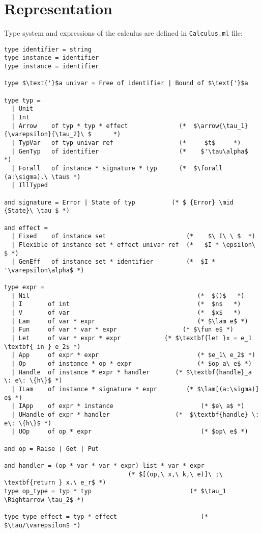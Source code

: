 \documentclass[declaration,shortabstract]{iithesis}
\theoremstyle{definition} \newtheorem{definition}{Definition}[section]
\newcommand{\arrow}[3]{{#1}\rightarrow_{#2}{#3}}
\newcommand{\lam}[1][x]{\ensuremath{\lambda #1.\:}}
\newcommand{\fun}[1][f,\:x]{\ensuremath{\textbf{fun } #1.\:}}
\begin{document}
\section{Representation}
Type system and expressions of the calculus are defined in \texttt{Calculus.ml} file:
\begin{lstlisting}
type identifier = string
type instance = identifier
type instance = identifier

type $\text{'}$a univar = Free of identifier | Bound of $\text{'}$a

type typ =
  | Unit
  | Int
  | Arrow    of typ * typ * effect              (*  $\arrow{\tau_1}{\varepsilon}{\tau_2}\ $      *)
  | TypVar   of typ univar ref                  (*     $t$     *)
  | GenTyp   of identifier                      (*    $'\tau\alpha$      *)
  | Forall   of instance * signature * typ      (*  $\forall (a:\sigma).\ \tau$ *)
  | IllTyped

and signature = Error | State of typ          (* $ {Error} \mid {State}\ \tau $ *)

and effect =
  | Fixed    of instance set                      (*    $\ I\ \ $  *)
  | Flexible of instance set * effect univar ref  (*   $I * \epsilon\ $ *)
  | GenEff   of instance set * identifier         (*  $I * '\varepsilon\alpha$ *)
 
type expr =
  | Nil                                              (*  $()$   *)
  | I       of int                                   (*  $n$   *)
  | V       of var                                   (*  $x$   *)
  | Lam     of var * expr                            (* $\lam e$ *)
  | Fun     of var * var * expr                  (* $\fun e$ *)
  | Let     of var * expr * expr            (* $\textbf{let }x = e_1 \textbf{ in } e_2$ *)
  | App     of expr * expr                           (* $e_1\ e_2$ *)
  | Op      of instance * op * expr                  (* $op_a\ e$ *)
  | Handle  of instance * expr * handler       (* $\textbf{handle}_a \: e\: \{h\}$ *)
  | ILam    of instance * signature * expr        (* $\lam[(a:\sigma)] e$ *)
  | IApp    of expr * instance                        (* $e\ a$ *)
  | UHandle of expr * handler                  (*  $\textbf{handle} \: e\: \{h\}$ *)
  | UOp     of op * expr                              (* $op\ e$ *)
  
and op = Raise | Get | Put

and handler = (op * var * var * expr) list * var * expr
                                  (* $[(op,\ x,\ k,\ e)]\ ;\ \textbf{return } x.\ e_r$ *)
type op_type = typ * typ                           (* $\tau_1 \Rightarrow \tau_2$ *)

type type_effect = typ * effect                       (* $\tau/\varepsilon$ *)
\end{lstlisting}
\end{document}
